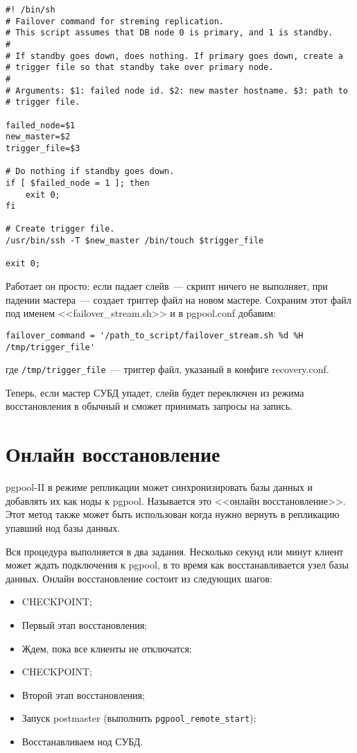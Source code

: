 \begin{lstlisting}[label=lst:pgpool40,caption=Скрипт выполняется при падении нода PostgreSQL]
#! /bin/sh
# Failover command for streming replication.
# This script assumes that DB node 0 is primary, and 1 is standby.
#
# If standby goes down, does nothing. If primary goes down, create a
# trigger file so that standby take over primary node.
#
# Arguments: $1: failed node id. $2: new master hostname. $3: path to
# trigger file.

failed_node=$1
new_master=$2
trigger_file=$3

# Do nothing if standby goes down.
if [ $failed_node = 1 ]; then
	exit 0;
fi

# Create trigger file.
/usr/bin/ssh -T $new_master /bin/touch $trigger_file

exit 0;
\end{lstlisting}

Работает он просто: если падает слейв~--- скрипт ничего не выполняет, при падении мастера~--- создает триггер файл на новом мастере. Сохраним этот файл под именем <<failover\_stream.sh>> и в pgpool.conf добавим:

\begin{lstlisting}[label=lst:pgpool41,caption=Что выполнять при падении нода]
failover_command = '/path_to_script/failover_stream.sh %d %H /tmp/trigger_file'
\end{lstlisting}

где \lstinline!/tmp/trigger_file!~--- триггер файл, указаный в конфиге recovery.conf.

Теперь, если мастер СУБД упадет, слейв будет переключен из режима восстановления в обычный и сможет принимать запросы на запись.

\section{Онлайн восстановление}

pgpool-II в режиме репликации может синхронизировать базы данных и добавлять их как ноды к pgpool. Называется это <<онлайн восстановление>>. Этот метод также может быть использован когда нужно вернуть в репликацию упавший нод базы данных.

Вся процедура выполняется в два задания. Несколько секунд или минут клиент может ждать подключения к pgpool, в то время как восстанавливается узел базы данных. Онлайн восстановление состоит из следующих шагов:

\begin{itemize}
  \item CHECKPOINT;
  \item Первый этап восстановления;
  \item Ждем, пока все клиенты не отключатся;
  \item CHECKPOINT;
  \item Второй этап восстановления;
  \item Запуск postmaster (выполнить \lstinline!pgpool_remote_start!);
  \item Восстанавливаем нод СУБД.
\end{itemize}

